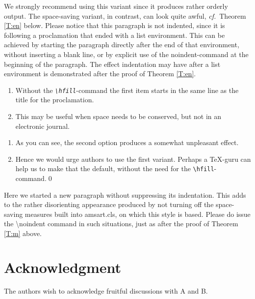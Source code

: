\documentclass{CSLM} %
\theoremstyle{plain}\newtheorem{satz}[thm]{Satz} %
\def\cf{{\em cf.}}
\begin{document}
  \noindent We strongly recommend using this variant since it produces
  rather orderly output.  The space-saving variant, in contrast, can
  look quite awful, \cf~Theorem \ref{T:en} below.  Please notice that
  this paragraph is not indented, since it is following a proclamation
  that ended with a list environment.  This can be achieved by
  starting the paragraph directly after the end of that environment,
  without inserting a blank line, or by explicit use of the
  noindent-command at the beginning of the paragraph.  The effect
  indentation may have after a list environment is demonstrated after
  the proof of Theorem \ref{T:en}. 
 
\begin{thm}\label{T:en} %

\begin{enumerate}%
\item  
  Without the \emph{\texttt{\textbackslash hfill}}-command the first item
  starts in the same line as the title for the proclamation.
\item
  This may be useful when space needs to be conserved, but not in an
  electronic journal.
\end{enumerate}
\end{thm}

\proof %
\begin{enumerate}%
\item
  As you can see, the second option produces a somewhat unpleasant effect.
\item
  Hence we would urge authors to use the first variant.  Perhaps a
  \TeX-guru can help us to make that the default, without the need for
  the \texttt{\textbackslash hfill}-command.\qed
\end{enumerate}

  Here we started a new paragraph without suppressing its
  indentation.  This adds to the rather disorienting appearance
  produced by not turning off the space-saving measures built into
  amsart.cls, on which this style is based.  Please do issue the
  \hbox{\textbackslash noindent} command in such situations, just as
  after the proof of Theorem \ref{T:m} above.

\section*{Acknowledgment}
  \noindent The authors wish to acknowledge fruitful discussions with
  A and B.
\end{document}
